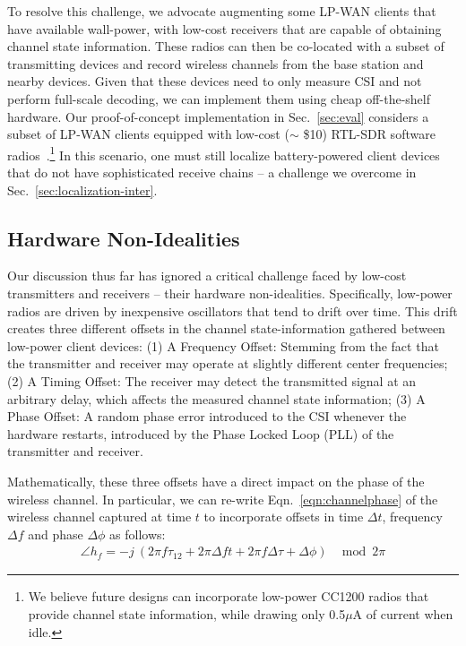 To resolve this challenge, we advocate augmenting some LP-WAN clients that have available wall-power, with low-cost receivers that are capable of obtaining channel state information. These radios can then be co-located with a subset of transmitting devices and record wireless channels from the base station and nearby devices. Given that these devices need to only measure CSI and not perform full-scale decoding, we can implement them using cheap off-the-shelf hardware. Our proof-of-concept implementation in Sec.~\ref{sec:eval} considers a subset of LP-WAN clients equipped with low-cost ($\sim$ \$10) RTL-SDR software radios~\cite{rtlsdr}.\footnote{We believe future designs can incorporate low-power CC1200 radios that provide channel state information, while drawing only 0.5$\mu$A of current when idle.} In this scenario, one must still  localize battery-powered client devices that do not have sophisticated receive chains -- a challenge we overcome in Sec.~\ref{sec:localization-inter}.

 

\subsection{Hardware Non-Idealities}\label{sec:nonideal}

Our discussion thus far has ignored a critical challenge faced by low-cost transmitters and receivers -- their hardware non-idealities. Specifically, low-power radios are driven by inexpensive oscillators that tend to drift over time. This drift creates three different offsets in the channel state-information gathered between low-power client devices: (1) A Frequency Offset: Stemming from the fact that the transmitter and receiver may operate at slightly different center frequencies; (2) A Timing Offset: The receiver may detect the transmitted signal at an arbitrary delay, which affects the measured channel state information; (3) A Phase Offset: A random phase error introduced to the CSI whenever the hardware restarts, introduced by the Phase Locked Loop (PLL) of the transmitter and receiver. 

Mathematically, these three offsets have a direct impact on the phase of the wireless channel. In particular, we can re-write Eqn.~\ref{eqn:channelphase} of the wireless channel captured at time $t$ to incorporate offsets in time $\Delta t$, frequency $\Delta f$ and phase $\Delta \phi$ as follows:
\begin{align}
\angle h_f = -j~(2 \pi f \tau_{12} + 2 \pi \Delta f t + 2 \pi f \Delta \tau + \Delta \phi) ~~\mod 2\pi
\end{align}

